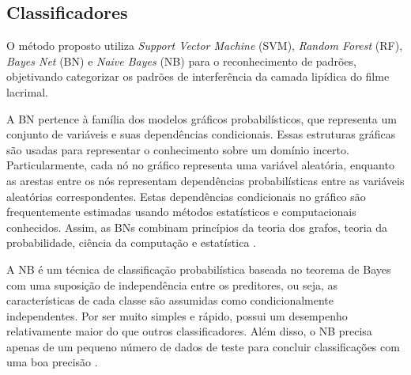 \subsection{Classificadores}
\label{sec:classificadores}

O método proposto utiliza \textit{Support Vector Machine} (SVM), \textit{Random Forest} (RF), \textit{Bayes Net} (BN) \cite{nielsen2009bayesian} e \textit{Naive Bayes} (NB) \cite{john2010elements} para o reconhecimento de padrões, objetivando categorizar os padrões de interferência da camada lipídica do filme lacrimal.


A BN pertence à família dos modelos gráficos probabilísticos, que representa um conjunto de variáveis e suas dependências condicionais. Essas estruturas gráficas são usadas para representar o conhecimento sobre um domínio incerto. Particularmente, cada nó no gráfico representa uma variável aleatória, enquanto as arestas entre os nós representam dependências probabilísticas entre as variáveis aleatórias correspondentes. Estas dependências condicionais no gráfico são frequentemente estimadas usando métodos estatísticos e computacionais conhecidos. Assim, as BNs combinam princípios da teoria dos grafos, teoria da probabilidade, ciência da computação e estatística \cite{nielsen2009bayesian}.


A NB é um técnica de classificação probabilística baseada no teorema de Bayes com uma suposição de independência entre os preditores, ou seja, as características de cada classe são assumidas como condicionalmente independentes. Por ser muito simples e rápido, possui um desempenho relativamente maior do que outros classificadores. Além disso, o NB precisa apenas de um pequeno número de dados de teste para concluir classificações com uma boa precisão \cite{jensen1996introduction}.

    
